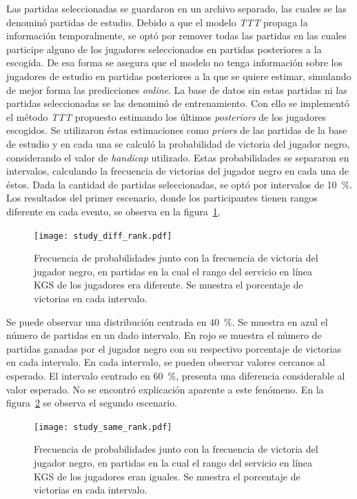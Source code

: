 \documentclass[11pt,twoside,spanish]{report} %
\begin{document}
Las partidas seleccionadas se guardaron en un archivo separado, las cuales se las denomin\'o  partidas de estudio.
Debido a que el modelo \textit{TTT} propaga la informaci\'on temporalmente, se opt\'o por remover todas las partidas en las cuales participe alguno de los jugadores seleccionados en partidas posteriores a la escogida.
De esa forma se asegura que el modelo no tenga informaci\'on sobre los jugadores de estudio en partidas posteriores a la que se quiere estimar, simulando de mejor forma las predicciones \textit{online}.
La base de datos sin estas partidas ni las partidas seleccionadas se las denomin\'o de entrenamiento.
Con ello se implement\'o el m\'etodo \textit{TTT} propuesto estimando los \'ultimos \textit{posteriors} de los jugadores escogidos.
Se utilizaron \'estas estimaciones como \textit{priors} de las partidas de la base de estudio y en cada una se calcul\'o la probabilidad de victoria del jugador negro, considerando el valor de \textit{handicap} utilizado.
Estas probabilidades se separaron en intervalos, calculando la frecuencia de victorias del jugador negro en cada una de \'estos.
Dada la cantidad de partidas seleccionadas, se opt\'o por intervalos de \SI{10}{\percent}.
Los resultados del primer escenario, donde los participantes tienen rangos diferente en cada evento, se observa en la figura~\ref{fig:diffRank}, 

\begin{figure}[H]
    \centering
    \texttt{[image: study\_diff\_rank.pdf]}
    \caption{Frecuencia de probabilidades junto con la frecuencia de victoria del jugador negro, en partidas en la cual el rango del servicio en l\'inea KGS de los jugadores era diferente. Se muestra el porcentaje de victorias en cada intervalo.}
    \label{fig:diffRank}
\end{figure}

Se puede observar una distribuci\'on centrada en \SI{40}{\percent}. 
Se muestra en azul el n\'umero de partidas en un dado intervalo.
En rojo se muestra el n\'umero de partidas ganadas por el jugador negro con su respectivo porcentaje de victorias en cada intervalo.
En cada intervalo, se pueden observar valores cercanos al esperado.
El intervalo centrado en \SI{60}{\percent}, presenta una diferencia considerable al valor esperado.
No se encontr\'o explicaci\'on aparente a este fen\'omeno.
En la figura~\ref{fig:sameRank} se observa el segundo escenario.


\begin{figure}[H]
    \centering
    \texttt{[image: study\_same\_rank.pdf]}
    \caption{Frecuencia de probabilidades junto con la frecuencia de victoria del jugador negro, en partidas en la cual el rango del servicio en l\'inea KGS de los jugadores eran iguales. Se muestra el porcentaje de victorias en cada intervalo.}
    \label{fig:sameRank}
\end{figure}
\end{document}

